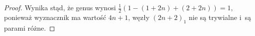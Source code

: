 \begin{proof}
\begin{comment}
            \draw[semithick] (0,-10) circle (3);

            \draw[semithick] (-30, 15) to [out=left, in=up]   (-45, 0);
            \draw[semithick] (-30,-15) to [out=left, in=down] (-45, 0);
            \draw[semithick] (-30,  5) to [out=left, in=up]   (-35, 0);
            \draw[semithick] (-30, -5) to [out=left, in=down] (-35, 0);

            \draw[semithick] (30, 15) to [out=right, in=up]   (45,0);
            \draw[semithick] (30,-15) to [out=right, in=down] (45,0);
            \draw[semithick] (30,  5) to [out=right, in=up]   (35,0);
            \draw[semithick] (30, -5) to [out=right, in=down] (35,0);

            \draw[semithick] (-30, 15) to [out=right, in=up] (-20,10);
            \draw[semithick] (-30,  5) to [out=right, in=down] (-20,10);

            \draw[semithick] (30, 15) to [out=left, in=up] (20,10);
            \draw[semithick] (30,  5) to [out=left, in=down] (20,10);

            \draw[semithick] (-10, 10) circle (5);
            \draw[semithick] (10,  10) circle (5);
        \end{tikzpicture}
    \]
\end{comment}
    Wynika stąd, że genus wynosi $\frac 12 (1 - (1+2n) + (2+2n)) = 1$, ponieważ wyznacznik ma wartość $4n+1$,
    węzły $(2n+2)_1$ nie są trywialne i~są parami różne.
\end{proof}


